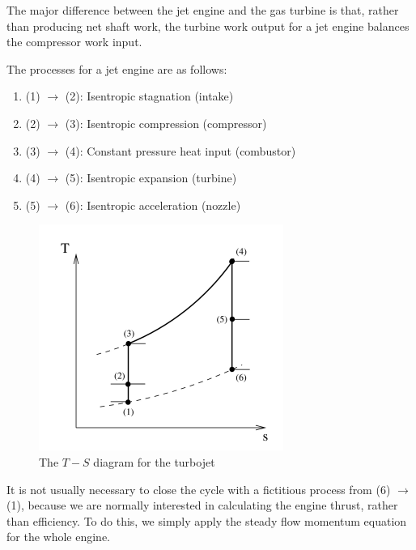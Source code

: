 \documentclass{article}
\begin{document}
The major difference between the jet engine and the gas turbine is that, rather than producing net shaft work, the turbine work output for a jet engine balances the compressor work input.

The processes for a jet engine are as follows:

\begin{enumerate}
    \item (1) $\to$ (2): Isentropic stagnation (intake)
    \item (2) $\to$ (3): Isentropic compression (compressor)
    \item (3) $\to$ (4): Constant pressure heat input (combustor)
    \item (4) $\to$ (5): Isentropic expansion (turbine)
    \item (5) $\to$ (6): Isentropic acceleration (nozzle)
\end{enumerate}

\begin{figure}[h]
    \centering
    \includegraphics{images/Screenshot 2024-04-03 214437.png}
    \caption{The $T-S$ diagram for the turbojet}
    \label{fig:enter-label}
\end{figure}

It is not usually necessary to close the cycle with a fictitious process from (6) $\to$ (1), because we are normally interested in calculating the engine thrust, rather than efficiency. To do this, we simply apply the steady flow momentum equation for the whole engine.
\end{document}
